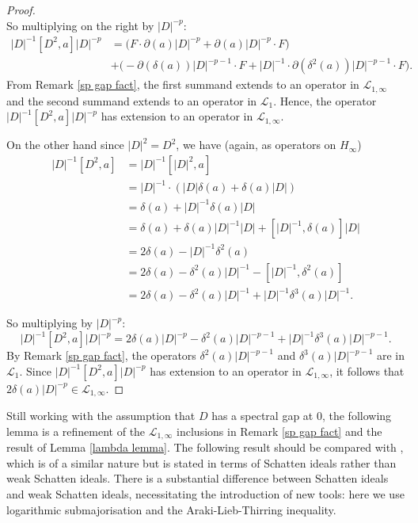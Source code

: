 \begin{proof}
\begin{equation*}
        \end{equation*}
        So multiplying on the right by $|D|^{-p}$:
        \begin{align*}
            |D|^{-1}[D^2,a]|D|^{-p} &= \Big(F\cdot\partial(a)|D|^{-p}+\partial(a)|D|^{-p}\cdot F\Big)\\
                                    &+ \Big(-\partial(\delta(a))|D|^{-p-1}\cdot F+|D|^{-1}\cdot\partial(\delta^2(a))|D|^{-p-1}\cdot F\Big).
        \end{align*}
        From Remark \ref{sp gap fact}, the first summand extends to an operator in $\mathcal{L}_{1,\infty}$ and the second summand extends to an operator in $\mathcal{L}_1.$
        Hence, the operator $|D|^{-1}[D^2,a]|D|^{-p}$ has extension to an operator in $\mathcal{L}_{1,\infty}$.

        On the other hand since $|D|^2 = D^2$, we have (again, as operators on $H_\infty$)
        \begin{align*}
            |D|^{-1}[D^2,a] &= |D|^{-1}[|D|^2,a]\\
                            &= |D|^{-1}\cdot(|D|\delta(a)+\delta(a)|D|)\\
                            &= \delta(a)+|D|^{-1}\delta(a)|D|\\
                            &= \delta(a)+\delta(a)|D|^{-1}|D|+[|D|^{-1},\delta(a)]|D|\\
                            &= 2\delta(a)-|D|^{-1}\delta^2(a)\\
                            &= 2\delta(a)-\delta^2(a)|D|^{-1}-[|D|^{-1},\delta^2(a)]\\
                            &= 2\delta(a)-\delta^2(a)|D|^{-1}+|D|^{-1}\delta^3(a)|D|^{-1}.
        \end{align*}
        
        So multiplying by $|D|^{-p}$:
        \begin{equation*}
            |D|^{-1}[D^2,a]|D|^{-p} = 2\delta(a)|D|^{-p}-\delta^2(a)|D|^{-p-1}+|D|^{-1}\delta^3(a)|D|^{-p-1}.
        \end{equation*}
        By Remark \ref{sp gap fact}, the operators $\delta^2(a)|D|^{-p-1}$ and $\delta^3(a)|D|^{-p-1}$ are in $\mathcal{L}_1$. 
        Since $|D|^{-1}[D^2,a]|D|^{-p}$ has extension to an operator in $\mathcal{L}_{1,\infty}$, it follows that $2\delta(a)|D|^{-p} \in \mathcal{L}_{1,\infty}$.
    \end{proof}

    Still working with the assumption that $D$ has a spectral gap at $0$, the following lemma is a refinement of the $\mathcal{L}_{1,\infty}$ inclusions in Remark \ref{sp gap fact} and the result of Lemma \ref{lambda lemma}. The following result should be compared with \cite[Lemma 1.37]{CGRS2}, which is of a similar nature but is stated in terms of Schatten ideals rather than weak Schatten ideals. There is a substantial difference between Schatten ideals and weak Schatten ideals, necessitating the introduction of new tools: here we use logarithmic submajorisation and the Araki-Lieb-Thirring inequality.
    

